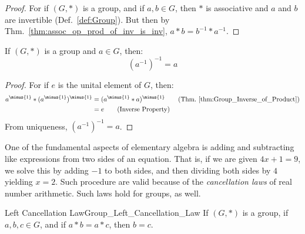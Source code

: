    \begin{proof}
        For if $(G,*)$ is a group, and if $a,b\in{G}$, then $*$ is associative
        and $a$ and $b$ are invertible (Def.~\ref{def:Group}). But then by
        Thm.~\ref{thm:assoc_op_prod_of_inv_is_inv},
        $a*b=b^{\minus{1}}*a^{\minus{1}}$.
    \end{proof}
    \begin{theorem}
        \label{thm:Group_Inverse_of_Inverse}%
        If $(G,*)$ is a group and $a\in{G}$, then:
        \begin{equation}
            (a^{\minus{1}})^{\minus{1}}=a
        \end{equation}
    \end{theorem}
    \begin{proof}
        For if $e$ is the unital element of $G$, then:
        \begin{align}
            a^{\minus{1}}*(a^{\minus{1}})^{\minus{1}}
            &=(a^{\minus{1}}* a)^{\minus{1}}
            \tag{Thm.~\ref{thm:Group_Inverse_of_Product}}\\
            &=e
            \tag{Inverse Property}
        \end{align}
        From uniqueness, $(a^{\minus{1}})^{\minus{1}}=a$.
    \end{proof}
    One of the fundamental aspects of elementary algebra is adding and
    subtracting like expressions from two sides of an equation. That is, if we
    are given $4x+1=9$, we solve this by adding $\minus{1}$ to both sides, and
    then dividing both sides by $4$ yielding $x=2$. Such procedure are valid
    because of the \textit{cancellation laws} of real number arithmetic. Such
    laws hold for groups, as well.
    \begin{ltheorem}{Left Cancellation Law}{Group_Left_Cancellation_Law}
        If $(G,*)$ is a group, if $a,b,c\in{G}$, and if $a*b=a*c$, then $b=c$.
    \end{ltheorem}
